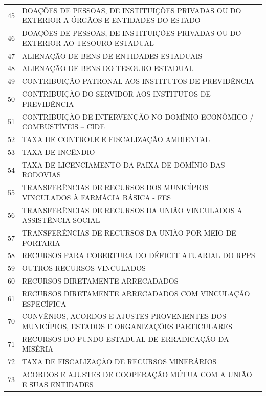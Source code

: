 \documentclass{article}
\begin{document}
\begin{longtable}[c]{m{1cm}|m{11cm}}
\multicolumn{1}{c|}{ 45 } & DOAÇÕES DE PESSOAS, DE INSTITUIÇÕES PRIVADAS OU DO EXTERIOR A ÓRGÃOS E ENTIDADES DO ESTADO \\
\multicolumn{1}{c|}{ 46 } & DOAÇÕES DE PESSOAS, DE INSTITUIÇÕES PRIVADAS OU DO EXTERIOR AO TESOURO ESTADUAL \\
\multicolumn{1}{c|}{ 47 } & ALIENAÇÃO DE BENS DE ENTIDADES ESTADUAIS \\
\multicolumn{1}{c|}{ 48 } & ALIENAÇÃO DE BENS DO TESOURO ESTADUAL \\
\multicolumn{1}{c|}{ 49 } & CONTRIBUIÇÃO PATRONAL AOS INSTITUTOS DE PREVIDÊNCIA \\
\multicolumn{1}{c|}{ 50 } & CONTRIBUIÇÃO DO SERVIDOR AOS INSTITUTOS DE PREVIDÊNCIA \\
\multicolumn{1}{c|}{ 51 } & CONTRIBUIÇÃO DE INTERVENÇÃO NO DOMÍNIO ECONÔMICO / COMBUSTÍVEIS – CIDE \\
\multicolumn{1}{c|}{ 52 } & TAXA DE CONTROLE E FISCALIZAÇÃO AMBIENTAL \\
\multicolumn{1}{c|}{ 53 } & TAXA DE INCÊNDIO \\
\multicolumn{1}{c|}{ 54 } & TAXA DE LICENCIAMENTO DA FAIXA DE DOMÍNIO DAS RODOVIAS \\
\multicolumn{1}{c|}{ 55 } & TRANSFERÊNCIAS DE RECURSOS DOS MUNICÍPIOS VINCULADOS À FARMÁCIA BÁSICA - FES \\
\multicolumn{1}{c|}{ 56 } & TRANSFERÊNCIAS DE RECURSOS DA UNIÃO VINCULADOS A ASSISTÊNCIA SOCIAL \\
\multicolumn{1}{c|}{ 57 } & TRANSFERÊNCIAS DE RECURSOS DA UNIÃO POR MEIO DE PORTARIA \\
\multicolumn{1}{c|}{ 58 } & RECURSOS PARA COBERTURA DO DÉFICIT ATUARIAL DO RPPS \\
\multicolumn{1}{c|}{ 59 } & OUTROS RECURSOS VINCULADOS \\
\multicolumn{1}{c|}{ 60 } & RECURSOS DIRETAMENTE ARRECADADOS \\
\multicolumn{1}{c|}{ 61 } & RECURSOS DIRETAMENTE ARRECADADOS COM VINCULAÇÃO ESPECÍFICA \\
\multicolumn{1}{c|}{ 70 } & CONVÊNIOS, ACORDOS E AJUSTES PROVENIENTES DOS MUNICÍPIOS, ESTADOS E ORGANIZAÇÕES PARTICULARES \\
\multicolumn{1}{c|}{ 71 } & RECURSOS DO FUNDO ESTADUAL DE ERRADICAÇÃO DA MISÉRIA \\
\multicolumn{1}{c|}{ 72 } & TAXA DE FISCALIZAÇÃO DE RECURSOS MINERÁRIOS \\
\multicolumn{1}{c|}{ 73 } & ACORDOS E AJUSTES DE COOPERAÇÃO MÚTUA COM A UNIÃO E SUAS ENTIDADES \\

\end{longtable}
\end{document}
